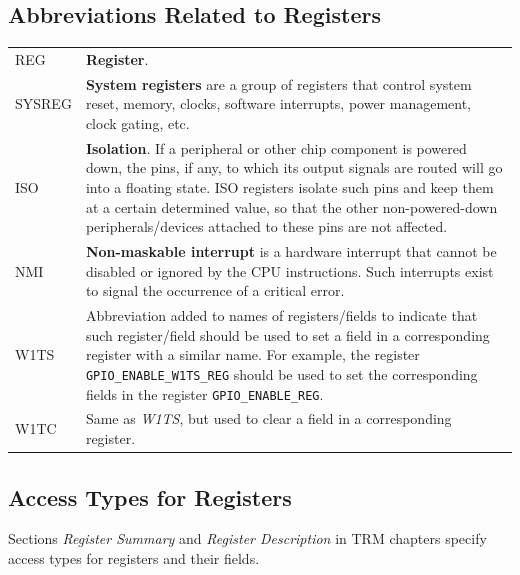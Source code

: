 
\subsection*{Abbreviations Related to Registers}\label{glossary-abbr-reg}

\begin{longtable}[c]{ R{3cm} p{12cm} }

REG     & \textbf{Register}. \\
SYSREG  & \textbf{System registers} are a group of registers that control system reset, memory, clocks, software interrupts, power management, clock gating, etc. \\
ISO     & \textbf{Isolation}. If a peripheral or other chip component is powered down, the pins, if any, to which its output signals are routed will go into a floating state. ISO registers isolate such pins and keep them at a certain determined value, so that the other non-powered-down peripherals/devices attached to these pins are not affected. \\
NMI     & \textbf{Non-maskable interrupt} is a hardware interrupt that cannot be disabled or ignored by the CPU instructions. Such interrupts exist to signal the occurrence of a critical error. \\
W1TS    & Abbreviation added to names of registers/fields to indicate that such register/field should be used to set a field in a corresponding register with a similar name. For example, the register \texttt{GPIO\_ENABLE\_W1TS\_REG} should be used to set the corresponding fields in the register \texttt{GPIO\_ENABLE\_REG}. \\
W1TC    & Same as \textit{W1TS}, but used to clear a field in a corresponding register. \\

\end{longtable}



\clearpage
{}
\subsection*{Access Types for Registers}\label{glossary-access-types}

Sections \textit{Register Summary} and \textit{Register Description} in TRM chapters specify access types for registers and their fields.

